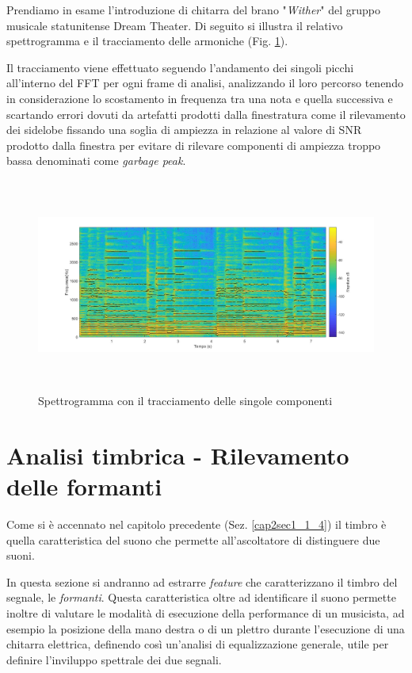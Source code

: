 \documentclass[12pt]{report}
\begin{document}
Prendiamo in esame l'introduzione di chitarra del brano "{\itshape Wither}" del gruppo musicale statunitense Dream Theater. Di seguito si illustra il relativo spettrogramma e il tracciamento delle armoniche (Fig. \ref{fig:wither}).

Il tracciamento viene effettuato seguendo l'andamento dei singoli picchi all'interno del FFT per ogni frame di analisi, analizzando il loro percorso tenendo in considerazione lo scostamento in frequenza tra una nota e quella successiva e scartando errori dovuti da artefatti prodotti dalla finestratura come il rilevamento dei sidelobe fissando una soglia di ampiezza in relazione al valore di SNR prodotto dalla finestra per evitare di rilevare componenti di ampiezza troppo bassa denominati come {\itshape garbage peak}.

\begin{figure}[htbp]
\centerline{\includegraphics[height=70mm]{img/wither}}
\caption{Spettrogramma con il tracciamento delle singole componenti}
\label{fig:wither}
\end{figure}			

\clearpage

	\section{Analisi timbrica - Rilevamento delle formanti}
	\label{cap3sec3}
		Come si è accennato nel capitolo precedente (Sez. \ref{cap2sec1_1_4}) il timbro è quella caratteristica del suono che permette all'ascoltatore di distinguere due suoni.

In questa sezione si andranno ad estrarre {\itshape feature} che caratterizzano il timbro del segnale, le {\itshape formanti}.
Questa caratteristica oltre ad identificare il suono permette inoltre di valutare le modalità di esecuzione della performance di un musicista, ad esempio la posizione della mano destra o di un plettro durante l'esecuzione di una chitarra elettrica, definendo così un'analisi di equalizzazione generale, utile per definire l'inviluppo spettrale dei due segnali.
\end{document}

